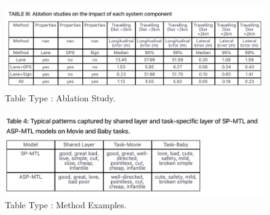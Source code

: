 \begin{figure}[h!]
    \centering
    \includegraphics[width=\maxwidth{\textwidth}]{src/images/type-exp-ablation.png}
    \caption{Table Type : Ablation Study. }
    \label{figure\arabic{figurecounter}}
\end{figure}

\begin{figure}[h!]
    \centering
    \includegraphics[width=\maxwidth{\textwidth}]{src/images/type-exp-method.png}
    \caption{Table Type : Method Examples.}
    \label{figure\arabic{figurecounter}}
\end{figure}

